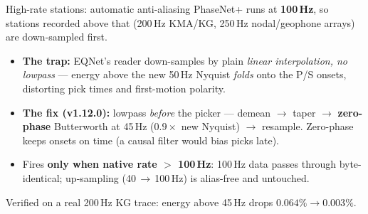 \documentclass[10pt,aspectratio=169]{beamer}
\begin{document}
\begin{frame}{High-rate stations: automatic anti-aliasing}
PhaseNet+ runs at \textbf{100\,Hz}, so stations recorded above that
(200\,Hz KMA/KG, 250\,Hz nodal/geophone arrays) are down-sampled first.
\smallskip
\begin{itemize}
  \item \textbf{The trap:} EQNet's reader down-samples by plain \emph{linear interpolation, no
        lowpass} --- energy above the new 50\,Hz Nyquist \emph{folds} onto the P/S onsets,
        distorting pick times and first-motion polarity.
  \item \textbf{The fix (v1.12.0):} lowpass \emph{before} the picker --- demean $\to$ taper $\to$
        \textbf{zero-phase} Butterworth at 45\,Hz ($0.9\times$ new Nyquist) $\to$ resample.
        Zero-phase keeps onsets on time (a causal filter would bias picks late).
  \item Fires \textbf{only when native rate $>$ 100\,Hz}: 100\,Hz data passes through
        byte-identical; up-sampling (40\,$\to$\,100\,Hz) is alias-free and untouched.
\end{itemize}
\smallskip
{\small Verified on a real 200\,Hz KG trace: energy above 45\,Hz drops $0.064\% \to 0.003\%$.}
\end{frame}
\end{document}
